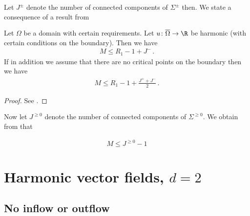 Let $J^\pm$ denote the number of connected components of $\Sigma^\pm$ then.
We state a consequence of a result from \cite[Theorem 2.1]{Alessandrini1992}
\begin{proposition} 
  Let $\Omega$ be a domain with certain requirements.
  Let $u\colon \overline{\Omega}\to \R$ be harmonic (with certain conditions on the boundary).
  Then we have
  \begin{align*}
    M\leq R_1-1+J^-\,.
  \end{align*}
  If in addition we assume that there are no critical points on the boundary then we have
  \begin{align*}
    M\leq R_1-1+\frac{J^++J^-}{2}\,.
  \end{align*}
\end{proposition}
\begin{proof}
  See \cite{Alessandrini1992}.
\end{proof}

Now let $J^{\geq0}$ denote the number of connected components of $\Sigma^{\geq0}$. 
We obtain from \cite{Deng2022} that
\begin{proposition}
  \begin{align*}
    M\leq J^{\geq0}-1
  \end{align*}
\end{proposition}


\newpage

\section{Harmonic vector fields, $d=2$}


\subsection{No inflow or outflow}

